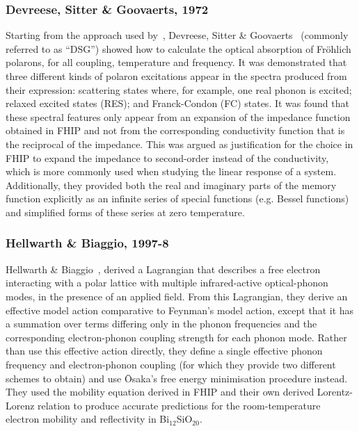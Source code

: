 \subsubsection{Devreese, Sitter \& Goovaerts, 1972}
\label{subsubsec:2-1-1-6}

Starting from the approach used by~\cite{feynman_mobility_1962}, Devreese, Sitter \& Goovaerts~\cite{devreese_optical_1972} (commonly referred to as ``DSG'') showed how to calculate the optical absorption of Fr\"ohlich polarons, for all coupling, temperature and frequency. It was demonstrated that three different kinds of polaron excitations appear in the spectra produced from their expression: scattering states where, for example, one real phonon is excited; relaxed excited states (RES); and Franck-Condon (FC) states. It was found that these spectral features only appear from an expansion of the impedance function obtained in FHIP and not from the corresponding conductivity function that is the reciprocal of the impedance. This was argued as justification for the choice in FHIP to expand the impedance to second-order instead of the conductivity, which is more commonly used when studying the linear response of a system. Additionally, they provided both the real and imaginary parts of the memory function explicitly as an infinite series of special functions (e.g. Bessel functions) and simplified forms of these series at zero temperature.

\subsubsection{Hellwarth \& Biaggio, 1997-8}
\label{subsubsec:2-1-1-7}

Hellwarth \& Biaggio~\cite{hellwarth_mobility_1999}, derived a Lagrangian that describes a free electron interacting with a polar lattice with multiple infrared-active optical-phonon modes, in the presence of an applied field. From this Lagrangian, they derive an effective model action comparative to Feynman's model action, except that it has a summation over terms differing only in the phonon frequencies and the corresponding electron-phonon coupling strength for each phonon mode. Rather than use this effective action directly, they define a single effective phonon frequency and electron-phonon coupling (for which they provide two different schemes to obtain) and use \=Osaka's free energy minimisation procedure instead. They used the mobility equation derived in FHIP and their own derived Lorentz-Lorenz relation to produce accurate predictions for the room-temperature electron mobility and reflectivity in Bi$_{12}$SiO$_{20}$.

